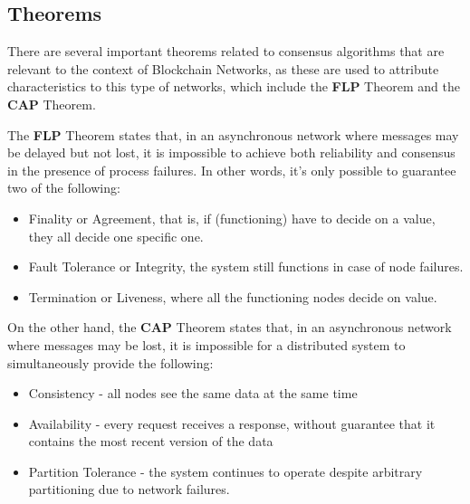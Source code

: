 \subsection*{Theorems}
There are several important theorems related to consensus algorithms that are relevant to the context of Blockchain Networks, as these are used to attribute characteristics to this type of networks, which include the \textbf{FLP} Theorem and the \textbf{CAP} Theorem.

% 
% 
% 
% 

The \textbf{FLP} Theorem states that, in an asynchronous network where messages may be delayed but not lost, it is impossible to achieve both reliability and consensus in the presence of process failures. In other words, it's only possible to guarantee two of the following:
\begin{itemize}
    \item Finality or Agreement, that is, if (functioning) have to decide on a value, they all decide one specific one.
    \item Fault Tolerance or Integrity, the system still functions in case of node failures.
    \item Termination or Liveness, where all the functioning nodes decide on value.
\end{itemize}



On the other hand, the \textbf{CAP} Theorem states that, in an asynchronous network where messages may be lost, it is impossible for a distributed system to simultaneously provide the following:
\begin{itemize}
    \item Consistency - all nodes see the same data at the same time
    \item Availability - every request receives a response, without guarantee that it contains the most recent version of the data
    \item Partition Tolerance - the system continues to operate despite arbitrary partitioning due to network failures.
\end{itemize}


